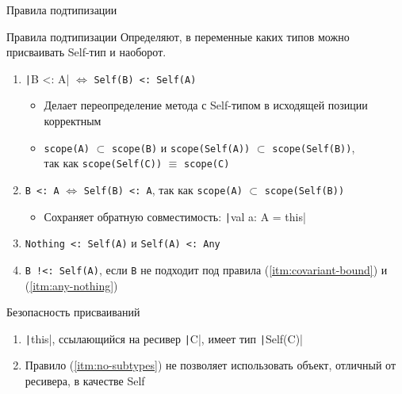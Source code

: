 \documentclass[handout,aspectratio=169,usenames,dvipsnames]{beamer}
\begin{document}
    \begin{frame}[fragile]{Правила подтипизации}
        \begin{block}{Правила подтипизации}
            Определяют, в переменные каких типов можно присваивать Self-тип и наоборот.
            \begin{enumerate}
                \item \label{itm:covariant-bound} \texttt|B <: A| $\iff$ \texttt{Self(B) <: Self(A)}
                \begin{itemize}
                    \item Делает переопределение метода с Self-типом в исходящей позиции корректным
                    \item \texttt{scope(A)} $\subset$ \texttt{scope(B)} и \texttt{scope(Self(A))} $\subset$ \texttt{scope(Self(B))},\\ так как \texttt{scope(Self(C))} $\equiv$ \texttt{scope(C)} \pause
                \end{itemize}
                \item \label{itm:this-subtype} \texttt{B <: A} $\iff$ \texttt{Self(B) <: A}, так как \texttt{scope(A)} $\subset$ \texttt{scope(Self(B))}
                \begin{itemize}
                    \item Сохраняет обратную совместимость: \texttt|val a: A = this|
                \end{itemize} \pause
                \item \label{itm:any-nothing} \texttt{Nothing <: Self(A)} и \texttt{Self(A) <: Any} \pause
                \item \label{itm:no-subtypes} \texttt{B  !<: Self(A)}, если \texttt{B} не подходит под правила (\ref{itm:covariant-bound}) и (\ref{itm:any-nothing})
            \end{enumerate}
        \end{block}
        \pause
        \begin{block}{Безопасность присваиваний}
            \begin{enumerate}
                \item \texttt|this|, ссылающийся на ресивер \texttt|C|, имеет тип \texttt|Self(C)|
                \item Правило (\ref{itm:no-subtypes}) не позволяет использовать объект, отличный от ресивера, в качестве Self
            \end{enumerate}
        \end{block}
    \end{frame}
\end{document}
